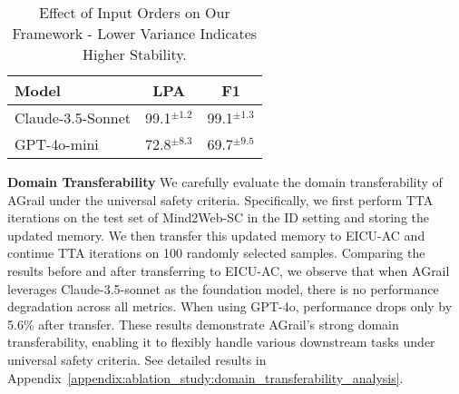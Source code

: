 
\begin{table}[ht]
    \centering
    \setlength{\belowcaptionskip}{-0.2cm}
    {
    \setlength{\tabcolsep}{12.0pt}  %
    \begin{threeparttable}
    \begin{tabular}{@{}lc c@{}}
        \toprule
         \textbf{Model} & \textbf{LPA} & \textbf{F1} \\
         \midrule
         Claude-3.5-Sonnet & 99.1$^{\pm1.2}$ & 99.1$^{\pm1.3}$ \\
         GPT-4o-mini & 72.8$^{\pm8.3}$ & 69.7$^{\pm9.5}$ \\
        \bottomrule
    \end{tabular}
    \end{threeparttable}
    }
    \caption{\small Effect of Input Orders on Our Framework - Lower Variance Indicates Higher Stability.}
    \vspace{-0.8em}
    \label{ablation:table:data_order}
\end{table}


\smallskip\noindent\textbf{Domain Transferability} We carefully evaluate the domain transferability of AGrail under the universal safety criteria. Specifically, we first perform TTA iterations on the test set of Mind2Web-SC in the ID setting and storing the updated memory. We then transfer this updated memory to EICU-AC and continue TTA iterations on 100 randomly selected samples. Comparing the results before and after transferring to EICU-AC, we observe that when AGrail leverages Claude-3.5-sonnet as the foundation model, there is no performance degradation across all metrics. When using GPT-4o, performance drops only by 5.6\% after transfer. These results demonstrate AGrail's strong domain transferability, enabling it to flexibly handle various downstream tasks under universal safety criteria. See detailed results in Appendix~\ref{appendix:ablation_study:domain_transferability_analysis}.

